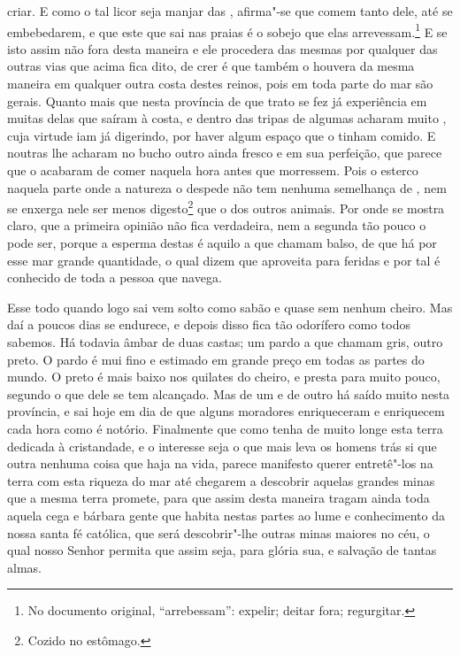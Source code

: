 criar. E como o tal licor seja manjar das , afirma"-se que comem
tanto dele, até se embebedarem, e que este que sai nas praias é o
sobejo que elas arrevessam.\footnote{ No documento original, ``arrebessam'': 
expelir; deitar fora; regurgitar.} E se isto assim não fora desta maneira e ele
procedera das mesmas  por qualquer das outras vias que acima fica
dito, de crer é que também o houvera da mesma maneira em qualquer
outra costa destes reinos, pois em toda parte do mar são gerais. Quanto
mais que nesta província de que trato se fez já experiência em muitas
delas que saíram à costa, e dentro das tripas de algumas acharam muito
, cuja virtude iam já digerindo, por haver algum espaço que o
tinham comido. E noutras lhe acharam no bucho outro ainda fresco e em
sua perfeição, que parece que o acabaram de comer naquela hora antes
que morressem. Pois o esterco naquela parte onde a natureza o despede
não tem nenhuma semelhança de , nem se enxerga nele ser menos
digesto\footnote{ Cozido no estômago.} que o dos outros animais. Por
onde se mostra claro, que a primeira opinião não fica verdadeira, nem a
segunda tão pouco o pode ser, porque a esperma destas  é aquilo
a que chamam balso, de que há por esse mar grande quantidade, o qual
dizem que aproveita para feridas e por tal é conhecido de toda a pessoa que navega. 

Esse  todo quando logo sai vem solto como sabão e quase sem nenhum
cheiro. Mas daí a poucos dias se endurece, e depois disso fica tão
odorífero como todos sabemos. Há todavia âmbar de duas castas; um
pardo a que chamam gris, outro preto. O pardo é mui fino e estimado em
grande preço em todas as partes do mundo. O preto é mais baixo nos
quilates do cheiro, e presta para muito pouco, segundo o que dele se tem
alcançado. Mas de um e de outro há saído muito nesta província, e sai
hoje em dia de que alguns moradores enriqueceram e enriquecem cada
hora como é notório. Finalmente que como  tenha de muito longe esta
terra dedicada à cristandade, e o interesse seja o que mais leva os
homens trás si que outra nenhuma coisa que haja na vida, parece
manifesto querer entretê"-los na terra com esta riqueza do mar até
chegarem a descobrir aquelas grandes minas que a mesma terra promete,
para que assim desta maneira tragam ainda toda aquela cega e bárbara
gente que habita nestas partes ao lume e conhecimento da nossa santa				%
fé católica, que será descobrir"-lhe outras minas maiores no céu, o qual
nosso Senhor permita que assim seja, para glória sua, e salvação de
tantas almas.



